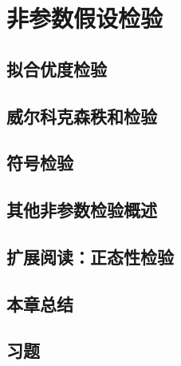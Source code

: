 \setcounter{chapter}{8} %
\chapter{非参数假设检验}
\label{chap:study-nonparametric-testing}

\section{拟合优度检验}
\label{sec:study-goodness-of-fit}

\section{威尔科克森秩和检验}
\label{sec:study-wilcoxon}

\section{符号检验}
\label{sec:study-sign-test}

\section{其他非参数检验概述}
\label{sec:study-other-nonparametric}

\section{扩展阅读：正态性检验}
\label{sec:study-normality-tests}

\section*{本章总结}

\section*{习题}





